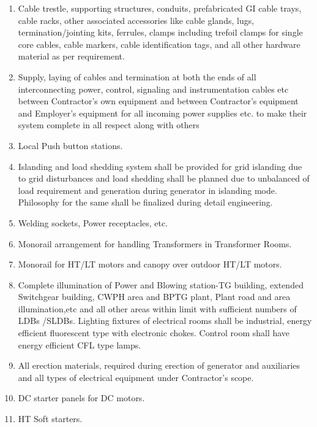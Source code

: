 \documentclass[english,11pt]{report}
\begin{document}
\begin{enumerate}
\item Cable trestle, supporting structures, conduits, prefabricated GI cable
trays, cable racks, other associated accessories like cable glands, lugs,
termination/jointing kits, ferrules, clamps including trefoil clamps for single
core cables, cable markers, cable identification tags, and all other
hardware material as per requirement.

\item Supply, laying of cables and termination at both the ends of all
interconnecting power, control, signaling and instrumentation cables etc
between Contractor's own equipment and between Contractor's
equipment and Employer's equipment for all incoming power supplies etc.
to make their system complete in all respect along with others 
\item Local Push button stations.

\item Islanding and load shedding system shall be provided for grid islanding
due to grid disturbances and load shedding shall be planned due to
unbalanced of load requirement and generation during generator in
islanding mode. Philosophy for the same shall be finalized during detail
engineering.

\item Welding sockets, Power receptacles, etc.

\item Monorail arrangement for handling Transformers in Transformer Rooms.

\item Monorail for HT/LT motors and canopy over outdoor HT/LT motors.

\item Complete illumination of Power and Blowing station-TG building,
extended Switchgear building, CWPH area and BPTG plant, Plant road
and area illumination,etc and all other areas within limit with sufficient
numbers of LDBs /SLDBs.
Lighting fixtures of electrical rooms shall be industrial, energy
efficient fluorescent type with electronic chokes. Control room shall
have energy efficient CFL type lamps.
\item All erection materials, required during erection of generator and
auxiliaries and all types of electrical equipment under Contractor's scope.

\item DC starter panels for DC motors.

\item HT Soft starters.


\end{enumerate}
\end{document}
